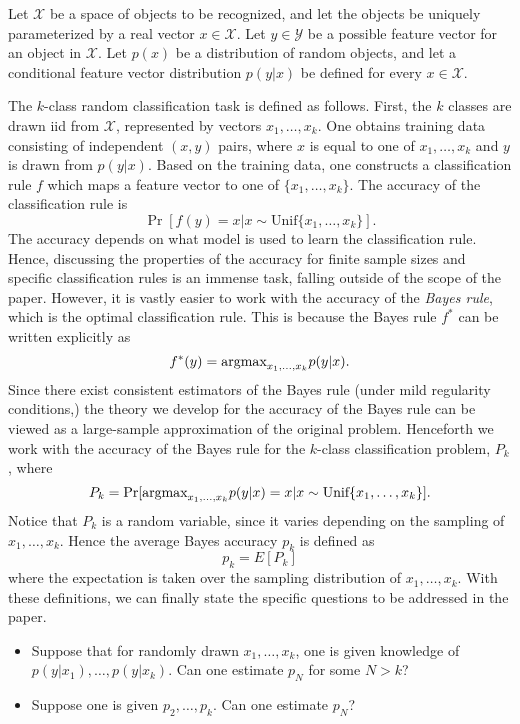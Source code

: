 \documentclass[12pt]{article}
\begin{document}
Let $\mathcal{X}$ be a space of objects to be recognized, and let the objects be uniquely parameterized
by a real vector $x \in \mathcal{X}$.  
Let $y \in \mathcal{Y}$ be a possible feature vector for an object in $\mathcal{X}$.
Let $p(x)$ be a distribution of random objects, and let a conditional feature vector distribution 
$p(y|x)$ be defined for every $x \in \mathcal{X}$.

The $k$-class random classification task is defined as follows.
First, the $k$ classes are drawn iid from $\mathcal{X}$, represented by vectors $x_1,\hdots, x_k$.
One obtains training data consisting of independent 
$(x, y)$ pairs, where $x$ is equal to one of $x_1,\hdots, x_k$
and $y$ is drawn from $p(y|x)$.
Based on the training data, one constructs a classification rule $f$ which maps a feature vector
to one of $\{x_1,\hdots, x_k\}$.
The accuracy of the classification rule is
\[
\Pr[f(y) = x|x \sim \text{Unif}\{x_1,\hdots, x_k\}].
\]
The accuracy depends on what model is used to learn the classification rule.
Hence, discussing the properties of the accuracy for finite sample sizes and specific
classification rules is an immense task, falling outside of the scope of the paper.
However, it is vastly easier to work with the accuracy of the \emph{Bayes rule},
which is the optimal classification rule.
This is because the Bayes rule $f^*$ can be written explicitly as
\[
f^*(y) = \text{argmax}_{x_1,\hdots, x_k} p(y|x).
\]
Since there exist consistent estimators of the Bayes rule (under mild regularity conditions,)
the theory we develop for the accuracy of the Bayes rule can be viewed as a large-sample approximation
of the original problem.
Henceforth we work with the accuracy of the Bayes rule for the $k$-class classification problem, $P_k$,
where
\[
P_k = \Pr[\text{argmax}_{x_1,\hdots, x_k} p(y|x) = x | x \sim \text{Unif}\{x_1,\hdots, x_k\}].
\]
Notice that $P_k$ is a random variable, since it varies depending on the sampling of $x_1,\hdots, x_k$.
Hence the average Bayes accuracy $p_k$ is defined as
\[
p_k = E[P_k]
\]
where the expectation is taken over the sampling distribution of $x_1,\hdots, x_k$.
With these definitions, we can finally state the specific questions to be addressed in the paper.

\begin{itemize}
\item Suppose that for randomly drawn $x_1,\hdots, x_k$, 
one is given knowledge of $p(y|x_1), \hdots, p(y|x_k)$.
Can one estimate $p_N$ for some $N > k$?
\item Suppose one is given $p_2,\hdots, p_k$. Can one estimate $p_N$?
\end{itemize}
\end{document}
